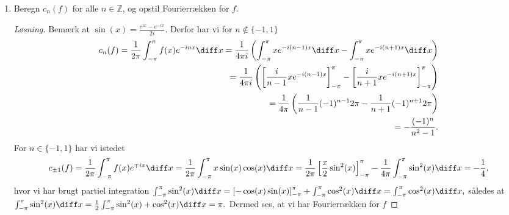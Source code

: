 \begin{opg}
\begin{enumerate}
		\item Beregn $ c_n(f) $ for alle $ n\in\mathbb{Z} $, og opstil Fourierrækken for $ f $. 
		\ifanswers
		\begin{proof}[Løsning]
			Bemærk at $ \sin(x)=\frac{e^{ix}-e^{-ix}}{2i} $. Derfor har vi for $ n\notin\{-1,1\} $\begin{equation*}
			\begin{aligned}
			c_n(f)=\frac{1}{2\pi}\int_{-\pi}^{\pi}f(x)e^{-inx}\diff x=\frac{1}{4\pi i} \left(\int_{-\pi}^{\pi}xe^{-i(n-1)x}\diff x-\int_{-\pi}^{\pi}xe^{-i(n+1)x}\diff x\right)\\
			=\frac{1}{4\pi i} \left(\left[\frac{i}{n-1}xe^{-i(n-1)x}\right]_{-\pi}^{\pi}-\left[\frac{i}{n+1}xe^{-i(n+1)x}\right]_{-\pi}^{\pi}\right)\\
			=\frac{1}{4\pi}\left(\frac{1}{n-1}(-1)^{n-1}2\pi-\frac{1}{n+1}(-1)^{n+1}2\pi\right)\\
			=-\frac{(-1)^n}{n^2-1}.
			\end{aligned}
			\end{equation*}
			For $ n\in\{-1,1\} $ har vi istedet\begin{equation*}
					c_{\pm 1}(f)=\frac{1}{2\pi}\int_{-\pi}^{\pi}f(x)e^{\mp ix} \diff x=\frac{1}{2\pi}\int_{-\pi}^{\pi}x\sin(x)\cos(x) \diff x=\frac{1}{2\pi}\left[\frac{x}{2}\sin^2(x)\right]_{-\pi}^{\pi}-\frac{1}{4\pi}\int_{-\pi}^{\pi}\sin^2(x)\diff x=-\frac{1}{4},
					\end{equation*}
			hvor vi har brugt partiel integration $ \int_{-\pi}^{\pi}\sin^2(x)\diff x=\left[-\cos(x)\sin(x)\right]_{-\pi}^{\pi}+\int_{-\pi}^{\pi}\cos^2(x)\diff x=\int_{-\pi}^{\pi}\cos^2(x)\diff x, $ således at\\ $ \int_{-\pi}^{\pi}\sin^2(x)\diff x=\frac{1}{2}\int_{-\pi}^{\pi}\sin^2(x)+\cos^2(x)\diff x=\pi. $ Dermed ses, at vi har Fourierrækken for $ f $

\end{proof}
\end{enumerate}
\end{opg}
